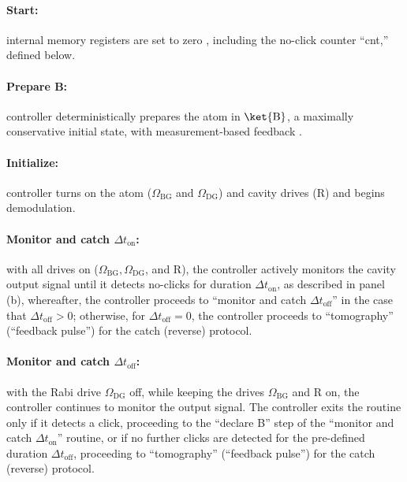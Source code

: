 \paragraph{Start:}

internal memory registers are set to zero \citep{Ofek2016,Liu2016Thesis},
including the no-click counter ``cnt,'' defined below. 

\paragraph{Prepare B:}

controller deterministically prepares the atom in $\ket{\mathrm{B}}$,
a maximally conservative initial state, with measurement-based feedback
\citep{Riste2012-qubit-measure-reset}. 

\paragraph{Initialize:}

controller turns on the atom ($\Omega_{\mathrm{BG}}$ and $\Omega_{\mathrm{DG}}$)
and cavity drives ($\mathrm{R}$) and begins demodulation. 

\paragraph{Monitor and catch $\Delta t_{\mathrm{on}}$: }

with all drives on ($\Omega_{\mathrm{BG}},\Omega_{\mathrm{DG}}$,
and $\mathrm{R}$), the controller actively monitors the cavity output
signal until it detects no-clicks for duration $\Delta t_{\mathrm{on}}$,
as described in panel (b), whereafter, the controller proceeds to
``monitor and catch $\Delta t_{\mathrm{off}}$'' in the case that
$\Delta t_{\mathrm{off}}>0$; otherwise, for $\Delta t_{\mathrm{off}}=0$,
the controller proceeds to ``tomography'' (``feedback pulse'')
for the catch (reverse) protocol.

\paragraph{Monitor and catch $\Delta t_{\mathrm{off}}$: }

with the Rabi drive $\Omega_{\mathrm{DG}}$ off, while keeping the
drives $\Omega_{\mathrm{BG}}$ and R on, the controller continues
to monitor the output signal. The controller exits the routine only
if it detects a click, proceeding to the ``declare B'' step of the
``monitor and catch $\Delta t_{\mathrm{on}}$'' routine, or if no
further clicks are detected for the pre-defined duration $\Delta t_{\mathrm{off}}$,
proceeding to ``tomography'' (``feedback pulse'') for the catch
(reverse) protocol.

